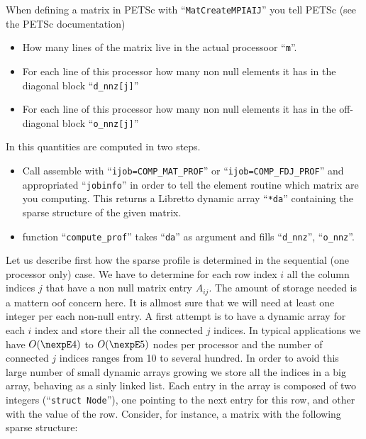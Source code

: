 

%
When defining a matrix in PETSc with ``\verb+MatCreateMPIAIJ+'' you
tell PETSc (see the PETSc documentation)
%
\begin{itemize}
\item How many lines of the matrix live in the actual processoor ``\verb+m+''. 
\item For each line of this processor how many non null elements it
has in the diagonal block ``\verb+d_nnz[j]+''
\item For each line of this processor how many non null elements it
has in the off-diagonal block ``\verb+o_nnz[j]+''
\end{itemize}
%
%
In \pfem{} this quantities are computed in two steps. 
\begin{itemize}
\item Call assemble with ``\verb+ijob=COMP_MAT_PROF+'' or
``\verb+ijob=COMP_FDJ_PROF+'' and appropriated ``\verb+jobinfo+'' in
order to tell the element routine which matrix are you computing.
This returns a Libretto dynamic array ``\verb+*da+'' containing the
sparse structure of the given matrix.

%
\item function ``\verb+compute_prof+'' takes ``\verb+da+'' as argument
and fills ``\verb+d_nnz+'', ``\verb+o_nnz+''. 
\end{itemize} 


%
Let us describe first how the sparse profile is determined in the
sequential (one processor only) case. We have to determine for each
row index $i$ all the column indices $j$ that have a non null matrix
entry $A_{ij}$. The amount of storage needed is a mattern oof concern
here. It is allmost sure that we will need at least one integer per
each non-null entry. A first attempt is to have a dynamic array for
each $i$ index and store their all the connected $j$ indices. In
typical applications we have $O(\nexpE4)$ to $O(\nexpE5)$ nodes per
processor and the number of connected $j$ indices ranges from 10 to
several hundred. In order to avoid this large number of small dynamic
arrays growing we store all the indices in a big array, behaving as a
sinly linked list. Each entry in
the array is composed of two integers (``\verb+struct Node+''), one
pointing to the next entry for this row, and other with the value of
the row. Consider, for instance, a matrix with the following sparse
structure: 

